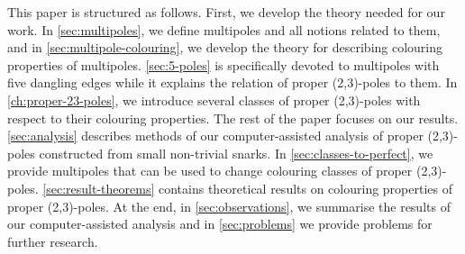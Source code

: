 


This paper is structured as follows. First, we develop the theory needed for our work. In \cref{sec:multipoles}, we define multipoles and all notions related to them, and in \cref{sec:multipole-colouring}, we develop the theory for describing colouring properties of multipoles. \cref{sec:5-poles} is specifically devoted to multipoles with five dangling edges while it explains the relation of proper (2,3)-poles to them. In \cref{ch:proper-23-poles}, we introduce several classes of proper (2,3)-poles with respect to their colouring properties. The rest of the paper focuses on our results. \cref{sec:analysis} describes methods of our computer-assisted analysis of proper (2,3)-poles constructed from small non-trivial snarks. In \cref{sec:classes-to-perfect}, we provide multipoles that can be used to change colouring classes of proper (2,3)-poles. \cref{sec:result-theorems} contains theoretical results on colouring properties of proper (2,3)-poles. At the end, in \cref{sec:observations}, we summarise the results of our computer-assisted analysis and in \cref{sec:problems} we provide problems for further research.

